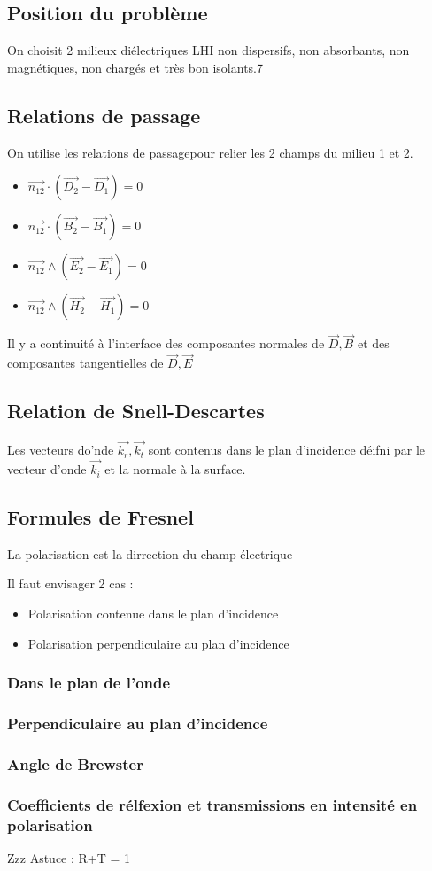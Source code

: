 \documentclass[french]{yLectureNote}
\renewcommand{\vec}{\overrightarrow}
\begin{document}
\subsection{Position du problème}
On choisit 2 milieux diélectriques LHI non dispersifs, non absorbants, non magnétiques, non chargés et très bon isolants.7
\subsection{Relations de passage}
On utilise les relations de passagepour relier les 2  champs du milieu 1 et 2.
\begin{itemize}
    \item $\vec{n_{12}}\cdot (\vec{D_2}-\vec{D_1})=0$
    \item $\vec{n_{12}}\cdot (\vec{B_2}-\vec{B_1})=0$
     \item $\vec{n_{12}}\wedge (\vec{E_2}-\vec{E_1})=0$
    \item $\vec{n_{12}}\wedge (\vec{H_2}-\vec{H_1})=0$
\end{itemize}
Il y a continuité à l'interface des composantes normales de $\vec{D},\vec{B}$ et des composantes tangentielles de $\vec{D}, \vec{E}$
\subsection{Relation de Snell-Descartes}
Les vecteurs do'nde $\vec{k_r}, \vec{k_t}$ sont contenus dans le plan d'incidence déifni par le vecteur d'onde $\vec{k_i}$ et la normale à la surface.
\subsection{Formules de Fresnel}
La polarisation est la dirrection du champ électrique

Il faut envisager 2  cas :
\begin{itemize}
    \item Polarisation contenue dans le plan d'incidence
    \item Polarisation perpendiculaire au plan d'incidence
\end{itemize}
\subsubsection{Dans le plan de l'onde}
\subsubsection{Perpendiculaire au plan d'incidence}
\subsubsection{Angle de Brewster}
\subsubsection{Coefficients de rélfexion et transmissions en intensité en polarisation}Zzz
Astuce : R+T = 1
\end{document}
